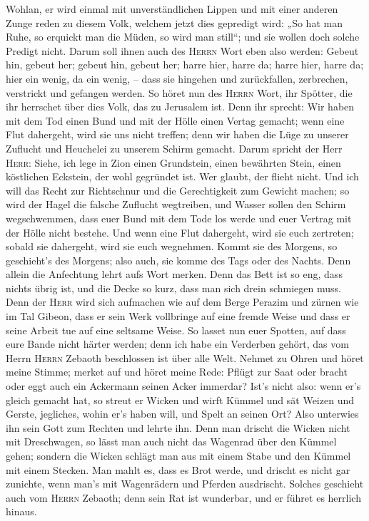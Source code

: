  Wohlan, er wird einmal mit unverständlichen Lippen und
mit einer anderen Zunge reden zu diesem Volk, welchem jetzt dies
gepredigt wird:  „So hat man Ruhe, so erquickt man die
Müden, so wird man still``; und sie wollen doch solche Predigt nicht.
 Darum soll ihnen auch des \textsc{Herrn} Wort eben also
werden: Gebeut hin, gebeut her; gebeut hin, gebeut her; harre hier,
harre da; harre hier, harre da; hier ein wenig, da ein wenig, -- dass
sie hingehen und zurückfallen, zerbrechen, verstrickt und gefangen
werden.  So höret nun des \textsc{Herrn} Wort, ihr
Spötter, die ihr herrschet über dies Volk, das zu Jerusalem ist.
 Denn ihr sprecht: Wir haben mit dem Tod einen Bund und
mit der Hölle einen Vertag gemacht; wenn eine Flut dahergeht, wird sie
uns nicht treffen; denn wir haben die Lüge zu unserer Zuflucht und
Heuchelei zu unserem Schirm gemacht.  Darum spricht der
Herr \textsc{Herr}: Siehe, ich lege in Zion einen Grundstein, einen
bewährten Stein, einen köstlichen Eckstein, der wohl gegründet ist. Wer
glaubt, der flieht nicht.  Und ich will das Recht zur
Richtschnur und die Gerechtigkeit zum Gewicht machen; so wird der Hagel
die falsche Zuflucht wegtreiben, und Wasser sollen den Schirm
wegschwemmen,  dass euer Bund mit dem Tode los werde und
euer Vertrag mit der Hölle nicht bestehe. Und wenn eine Flut dahergeht,
wird sie euch zertreten; sobald sie dahergeht, wird sie euch wegnehmen.
 Kommt sie des Morgens, so geschieht's des Morgens; also
auch, sie komme des Tags oder des Nachts. Denn allein die Anfechtung
lehrt aufs Wort merken.  Denn das Bett ist so eng, dass
nichts übrig ist, und die Decke so kurz, dass man sich drein schmiegen
muss.  Denn der \textsc{Herr} wird sich aufmachen wie auf
dem Berge Perazim und zürnen wie im Tal Gibeon, dass er sein Werk
vollbringe auf eine fremde Weise und dass er seine Arbeit tue auf eine
seltsame Weise.  So lasset nun euer Spotten, auf dass
eure Bande nicht härter werden; denn ich habe ein Verderben gehört, das
vom Herrn \textsc{Herrn} Zebaoth beschlossen ist über alle Welt.
 Nehmet zu Ohren und höret meine Stimme; merket auf und
höret meine Rede:  Pflügt zur Saat oder bracht oder eggt
auch ein Ackermann seinen Acker immerdar?  Ist's nicht
also: wenn er's gleich gemacht hat, so streut er Wicken und wirft Kümmel
und sät Weizen und Gerste, jegliches, wohin er's haben will, und Spelt
an seinen Ort?  Also unterwies ihn sein Gott zum Rechten
und lehrte ihn.  Denn man drischt die Wicken nicht mit
Dreschwagen, so lässt man auch nicht das Wagenrad über den Kümmel gehen;
sondern die Wicken schlägt man aus mit einem Stabe und den Kümmel mit
einem Stecken.  Man mahlt es, dass es Brot werde, und
drischt es nicht gar zunichte, wenn man's mit Wagenrädern und Pferden
ausdrischt.  Solches geschieht auch vom \textsc{Herrn}
Zebaoth; denn sein Rat ist wunderbar, und er führet es herrlich hinaus.

